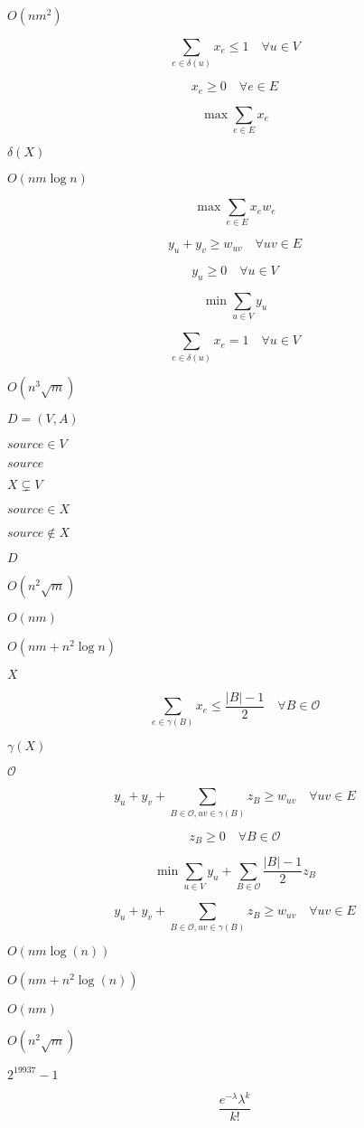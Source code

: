 \documentclass{article}
\begin{document}
$ O(nm^2) $
\pagebreak

\[ \sum_{e \in \delta(u)}x_e \le 1 \quad \forall u\in V\]
\pagebreak

\[x_e \ge 0\quad \forall e\in E\]
\pagebreak

\[\max \sum_{e\in E}x_e\]
\pagebreak

$\delta(X)$
\pagebreak

$O(nm\log n)$
\pagebreak

\[\max \sum_{e\in E}x_ew_e\]
\pagebreak

\[ y_u + y_v \ge w_{uv} \quad \forall uv\in E\]
\pagebreak

\[y_u \ge 0 \quad \forall u \in V\]
\pagebreak

\[\min \sum_{u \in V}y_u \]
\pagebreak

\[ \sum_{e \in \delta(u)}x_e = 1 \quad \forall u\in V\]
\pagebreak

$O(n^3\sqrt{m})$
\pagebreak

$D=(V,A)$
\pagebreak

$ source \in V $
\pagebreak

$ source $
\pagebreak

$ X\subsetneq V $
\pagebreak

$ source \in X $
\pagebreak

$ source \notin X $
\pagebreak

$ D $
\pagebreak

$ O(n^2\sqrt{m}) $
\pagebreak

$O(nm)$
\pagebreak

$ O(nm + n^2 \log n) $
\pagebreak

$ X $
\pagebreak

\[ \sum_{e \in \gamma(B)}x_e \le \frac{\vert B \vert - 1}{2} \quad \forall B\in\mathcal{O}\]
\pagebreak

$\gamma(X)$
\pagebreak

$\mathcal{O}$
\pagebreak

\[ y_u + y_v + \sum_{B \in \mathcal{O}, uv \in \gamma(B)} z_B \ge w_{uv} \quad \forall uv\in E\]
\pagebreak

\[z_B \ge 0 \quad \forall B \in \mathcal{O}\]
\pagebreak

\[\min \sum_{u \in V}y_u + \sum_{B \in \mathcal{O}} \frac{\vert B \vert - 1}{2}z_B\]
\pagebreak

\[ y_u + y_v + \sum_{B \in \mathcal{O}, uv \in \gamma(B)}z_B \ge w_{uv} \quad \forall uv\in E\]
\pagebreak

$ O(nm\log(n)) $
\pagebreak

$ O(nm+n^2\log(n)) $
\pagebreak

$ O(nm) $
\pagebreak

$O(n^2\sqrt{m})$
\pagebreak

$ 2^{19937} - 1 $
\pagebreak

\[ \frac{e^{-\lambda}\lambda^k}{k!} \]
\pagebreak
\end{document}
